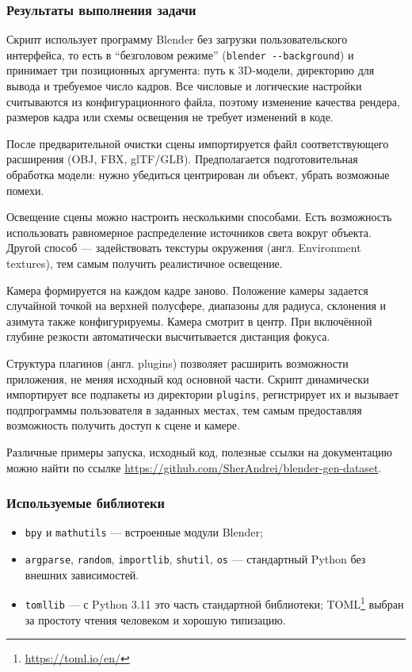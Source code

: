 \subsubsection{Результаты выполнения задачи}

Скрипт использует программу Blender без загрузки пользовательского интерфейса, то
есть в ``безголовом режиме'' (\texttt{blender -{}-background}) и принимает три
позиционных аргумента: путь к 3D-модели, директорию для вывода и требуемое число
кадров. Все числовые и логические настройки считываются из конфигурационного
файла, поэтому изменение качества рендера, размеров кадра или схемы освещения не
требует изменений в коде.

После предварительной очистки сцены импортируется файл соответствующего
расширения (OBJ, FBX, glTF/GLB). Предполагается подготовительная обработка
модели: нужно убедиться центрирован ли объект, убрать возможные помехи.

Освещение сцены можно настроить несколькими способами. Есть возможность использовать
равномерное распределение источников света вокруг объекта. Другой способ — задействовать
текстуры окружения (англ. Environment textures), тем самым получить реалистичное освещение.

Камера формируется на каждом кадре заново. Положение камеры задается случайной
точкой на верхней полусфере, диапазоны для радиуса, склонения и азимута также
конфигурируемы. Камера смотрит в центр. При включённой глубине резкости
автоматически высчитывается дистанция фокуса.

Структура плагинов (англ. plugins) позволяет расширить возможности приложения,
не меняя исходный код основной части. Скрипт динамически импортирует все подпакеты
из директории \texttt{plugins}, регистрирует их и вызывает подпрограммы пользователя
в заданных местах, тем самым предоставляя возможность получить доступ к сцене и камере.

Различные примеры запуска, исходный код, полезные ссылки на документацию можно найти
по ссылке \url{https://github.com/SherAndrei/blender-gen-dataset}.

\subsubsection*{Используемые библиотеки}

\begin{itemize}
    \item \texttt{bpy} и \texttt{mathutils} — встроенные модули Blender;
    \item \texttt{argparse}, \texttt{random}, \texttt{importlib},
    \texttt{shutil}, \texttt{os} — стандартный Python без внешних зависимостей.
    \item \texttt{tomllib} — с Python 3.11 это часть стандартной библиотеки;
    TOML\footnote{\url{https://toml.io/en/}} выбран за простоту чтения человеком
    и хорошую типизацию.
\end{itemize}

